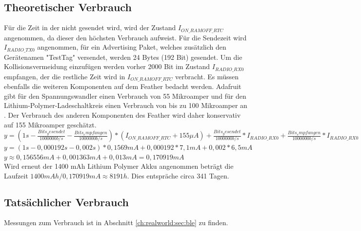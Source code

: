 \subsection{Theoretischer Verbrauch}
Für die Zeit in der nicht gesendet wird, wird der Zustand $I_{ON\_RAMOFF\_RTC}$ angenommen, da dieser den höchsten Verbrauch aufweist.
Für die Sendezeit wird $I_{RADIO\_TX0}$ angenommen, für ein Advertising Paket, welches zusätzlich den Gerätenamen "TestTag" versendet, werden 24 Bytes (192 Bit) gesendet.
Um die Kollisionsvermeidung einzufügen werden vorher 2000 Bit im Zustand $I_{RADIO\_RX0}$ empfangen, der die restliche Zeit wird in $I_{ON\_RAMOFF\_RTC}$ verbracht. 
Es müssen ebenfalls die weiteren Komponenten auf dem Feather bedacht werden. 
Adafruit gibt für den Spannungswandler einen Verbrauch von 55 Mikroamper und für den Lithium-Polymer-Ladeschaltkreis einen Verbrauch von bis zu 100 Mikroamper an \cite{fried2016lora}. 
Der Verbrauch des anderen Komponenten des Feather wird daher konservativ auf 155 Mikroamper geschätzt.\\[1cm]

$y = (1s-\frac{Bits_gesendet}{1000000 b/s} - \frac{Bits_empfangen}{1000000 b/s}) * (I_{ON\_RAMOFF\_RTC} + 155 {\mu}A) + \frac{Bits_gesendet}{1000000 b/s} * I_{RADIO\_RX0} + \frac{Bits_empfangen}{1000000 b/s} * I_{RADIO\_RX0}$\\[0.5cm]
$y = (1s - 0,000192s - 0,002s) * 0,1569mA + 0,000192 * 7,1mA + 0,002 * 6,5mA$\\[0.5cm]
$y \approx 0,156556mA + 0,001363mA + 0,013mA = 0,170919mA$ \\[1cm]

Wird erneut der 1400 mAh Lithium Polymer Akku angenommen beträgt die Laufzeit $1400mAh / 0,170919mA \approx 8191h$.
Dies entspräche circa 341 Tagen.\\
 

\subsection{Tatsächlicher Verbrauch}
Messungen zum Verbrauch ist in Abschnitt \ref{ch:realworld:sec:ble} zu finden. 


